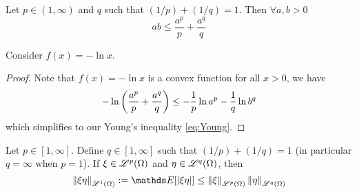 \begin{proposition}
Let $p \in (1,\infty)$ and $q$ such that $(1/p) + (1/q) = 1$. Then $\forall a,b > 0$
\begin{equation} \label{eq:Young}
    ab \leq \frac{a^p}{p} + \frac{a^q}{q}
\end{equation}
\end{proposition}

\begin{hint}
Consider $f(x) = -\ln x$.
\end{hint}

\begin{proof}
Note that $f(x) = -\ln x$ is a convex function for all $x > 0$, we have
\begin{equation*}
    -\ln\left( \frac{a^p}{p} + \frac{a^q}{q} \right) \leq -\frac{1}{p} \ln a^p - \frac{1}{q} \ln b^q
\end{equation*}
which simplifies to our Young's inequality \eqref{eq:Young}.
\end{proof}

\begin{proposition}
Let $p \in [1,\infty]$. Define $q \in [1,\infty]$ such that $(1/p)+(1/q) = 1$ (in particular $q = \infty$ when $p = 1$). If $\xi \in \mathcal{L}^p(\Omega)$ and $\eta \in \mathcal{L}^q(\Omega)$, then
\begin{equation} \label{eq:Holder}
    \norm{\xi \eta}_{\L^1(\Omega)} := \E[|\xi \eta|] \leq \norm{\xi}_{\L^p(\Omega)} \norm{\eta}_{\L^q(\Omega)}
\end{equation}
\end{proposition}

